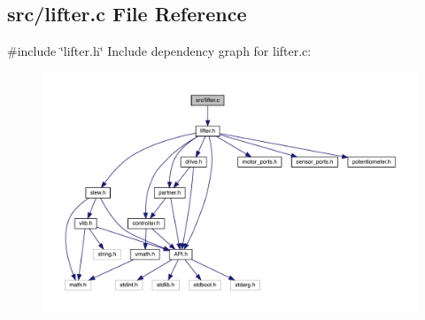 \subsection{src/lifter.c File Reference}
\label{lifter_8c}
{\ttfamily \#include \char`\"{}lifter.\+h\char`\"{}}\newline
Include dependency graph for lifter.\+c\+:\nopagebreak
\begin{figure}[H]
\begin{center}
\leavevmode
\includegraphics[width=350pt]{lifter_8c__incl}
\end{center}
\end{figure}
